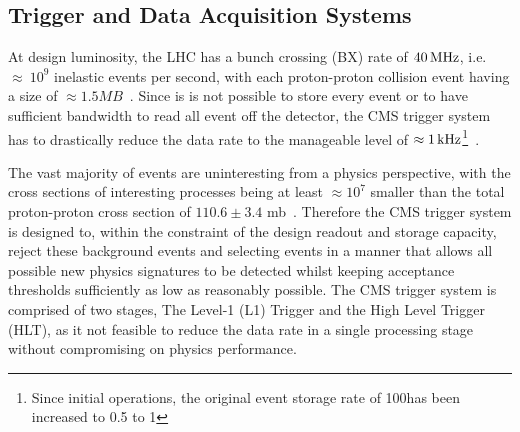 \subsection{Trigger and Data Acquisition Systems}\label{subsec:trigger}
At design luminosity, the LHC has a bunch crossing (BX) rate of $40\text{\,MHz}$, i.e. $\approx~10^{9}$ inelastic events per second, with each proton-proton collision event having a size of $\approx 1.5MB$~\cite{Bayatian:2006nff}.
Since is is not possible to store every event or to have sufficient bandwidth to read all event off the detector, the CMS trigger system~\cite{Dasu:2000ge,Sphicas:2002gg} has to drastically reduce the data rate to the manageable level of $\approx 1\text{\,kHz}$\footnote{Since initial operations, the original event storage rate of 100\Hz has been increased to 0.5 to 1\kHz}~\cite{Dasu:2000ge,phase1L1TDR}.

The vast majority of events are uninteresting from a physics perspective, with the cross sections of interesting processes being at least $\approx 10^{7}$ smaller than the total proton-proton cross section of $110.6 \pm 3.4$ mb~\cite{Antchev:2017dia}.
Therefore the CMS trigger system is designed to, within the constraint of the design readout and storage capacity, reject these background events and selecting events in a manner that allows all possible new physics signatures to be detected whilst keeping acceptance thresholds sufficiently as low as reasonably possible.
The CMS trigger system is comprised of two stages, The Level-1 (L1) Trigger and the High Level Trigger (HLT), as it not feasible to reduce the data rate in a single processing stage without compromising on physics performance.

